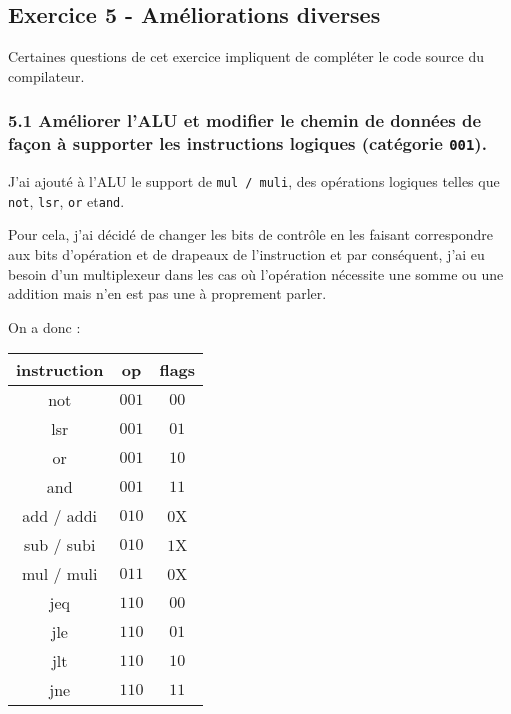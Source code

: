 \documentclass[twoside, 12pt, a4paper]{article}
\begin{document}
                
        \clearpage

        \subsection{Exercice 5 - Améliorations diverses}

Certaines questions de cet exercice impliquent de compléter le code source du compilateur.

        \subsubsection*{\textbf{5.1} Améliorer l'ALU et modifier le chemin de données de façon à supporter les instructions logiques (catégorie \texttt{001}).}

        J'ai ajouté à l'ALU le support de \texttt{mul / muli}, des opérations logiques telles que \texttt{not}, \texttt{lsr}, \texttt{or} et\texttt{and}.

        Pour cela, j'ai décidé de changer les bits de contrôle en les faisant correspondre aux bits d'opération et de drapeaux de l'instruction et par conséquent, j'ai eu besoin d'un multiplexeur dans les cas où l'opération nécessite une somme ou une addition mais n'en est pas une à proprement parler.

        On a donc :
        \ttfamily
        \begin{tabular}{|c|c|c|}
             \hline
             instruction & op & flags\\
             \hline
             not & $001$ & $00$\\
             lsr & $001$ & $01$\\
             or  & $001$ & $10$\\
             and & $001$ & $11$\\
             \hline
             add / addi & $010$ & $0$X\\
             sub / subi & $010$ &$1$X\\
             \hline
             mul / muli & $011$ & $0$X\\
             \hline
             jeq & $110$ & $00$\\
             jle & $110$ & $01$\\
             jlt & $110$ & $10$\\
             jne & $110$ & $11$\\
             \hline
        \end{tabular}
        
\end{document}
